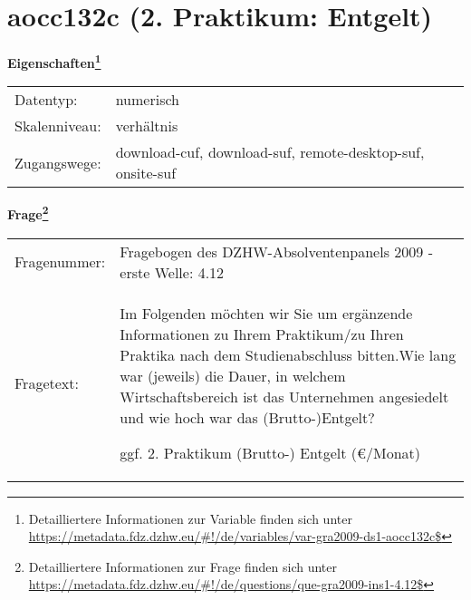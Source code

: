 
    \setcounter{footnote}{0}

    \vspace*{-1.8cm}
	\section{aocc132c (2. Praktikum: Entgelt)}
	\label{section:aocc132c}



    \vspace*{0.5cm}
    \noindent\textbf{Eigenschaften\footnote{Detailliertere Informationen zur Variable finden sich unter
		\url{https://metadata.fdz.dzhw.eu/\#!/de/variables/var-gra2009-ds1-aocc132c$}}}\\
	\begin{tabularx}{\hsize}{@{}lX}
	Datentyp: & numerisch \\
	Skalenniveau: & verhältnis \\
	Zugangswege: &
	  download-cuf, 
	  download-suf, 
	  remote-desktop-suf, 
	  onsite-suf
 \\
    \end{tabularx}



				\vspace*{0.5cm}
                \noindent\textbf{Frage\footnote{Detailliertere Informationen zur Frage finden sich unter
		              \url{https://metadata.fdz.dzhw.eu/\#!/de/questions/que-gra2009-ins1-4.12$}}}\\
				\begin{tabularx}{\hsize}{@{}lX}
					Fragenummer: &
					  Fragebogen des DZHW-Absolventenpanels 2009 - erste Welle:
					  4.12
 \\
					Fragetext: & Im Folgenden möchten wir Sie um ergänzende Informationen zu Ihrem Praktikum/zu Ihren Praktika nach dem Studienabschluss bitten.Wie lang war (jeweils) die Dauer, in welchem Wirtschaftsbereich ist das Unternehmen angesiedelt und wie hoch war das (Brutto-)Entgelt?\par  ggf. 2. Praktikum (Brutto-) Entgelt (€/Monat) \\
				\end{tabularx}





